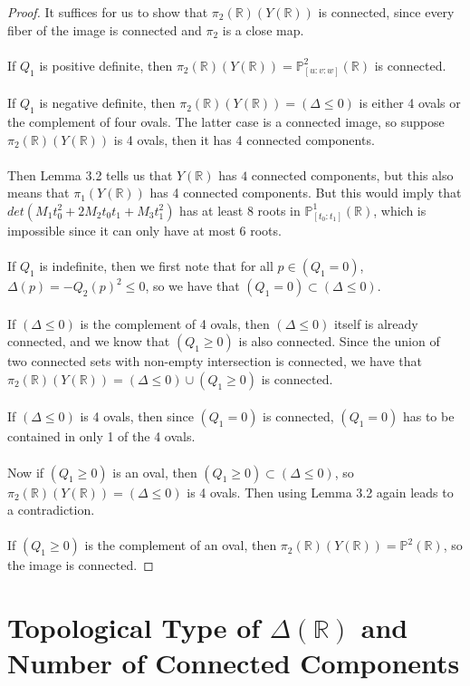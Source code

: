 \documentclass{article}
\newcommand{\Rbb}{\mathbb{R}}
\newcommand{\Pbb}{\mathbb{P}}
\begin{document}
\begin{proof}
It suffices for us to show that $\pi_2(\Rbb)(Y(\Rbb))$ is connected, since every fiber of the image is connected and $\pi_2$ is a close map.\\\\
If $Q_1$ is positive definite, then $\pi_2(\Rbb)(Y(\Rbb)) = \Pbb^2_{[u:v:w]}(\Rbb)$ is connected.\\\\
If $Q_1$ is negative definite, then $\pi_2(\Rbb)(Y(\Rbb)) = (\Delta \leq 0)$ is either 4 ovals or the complement of four ovals. The latter case is a connected image, so suppose $\pi_2(\Rbb)(Y(\Rbb))$ is 4 ovals, then it has 4 connected components.\\\\
Then Lemma 3.2 tells us that $Y(\Rbb)$ has $4$ connected components, but this also means that $\pi_1(Y(\Rbb))$ has 4 connected components. But this would imply that $det(M_1t_0^2 + 2M_2t_0t_1 + M_3t_1^2)$ has at least $8$ roots in $\Pbb^1_{[t_0:t_1]}(\Rbb)$, which is impossible since it can only have at most $6$ roots.\\\\
If $Q_1$ is indefinite, then we first note that for all $p \in (Q_1 = 0)$, $\Delta(p) = -Q_2(p)^2 \leq 0$, so we have that $(Q_1 = 0) \subset (\Delta \leq 0)$.\\\\
If $(\Delta \leq 0)$ is the complement of 4 ovals, then $(\Delta \leq 0)$ itself is already connected, and we know that $(Q_1 \geq 0)$ is also connected. Since the union of two connected sets with non-empty intersection is connected, we have that $\pi_2(\Rbb)(Y(\Rbb)) = (\Delta \leq 0) \cup (Q_1 \geq 0)$ is connected.\\\\
If $(\Delta \leq 0)$ is 4 ovals, then since $(Q_1 = 0)$ is connected, $(Q_1 = 0)$ has to be contained in only 1 of the 4 ovals.\\\\
Now if $(Q_1 \geq 0)$ is an oval, then $(Q_1 \geq 0) \subset (\Delta \leq 0)$, so $\pi_2(\Rbb)(Y(\Rbb)) = (\Delta \leq 0)$ is 4 ovals. Then using Lemma 3.2 again leads to a contradiction.\\\\
If $(Q_1 \geq 0)$ is the complement of an oval, then $\pi_2(\Rbb)(Y(\Rbb)) = \Pbb^2(\Rbb)$, so the image is connected.
\end{proof}

\section{Topological Type of $\Delta(\Rbb)$ and Number of Connected Components}
\end{document}
